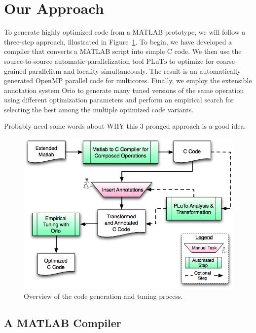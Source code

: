 \documentclass[11pt]{article}
\begin{document}




\section{Our Approach}
\label{sec:approach}

To generate highly optimized code from a MATLAB prototype, we will follow a three-step approach, illustrated in Figure~\ref{fig:process}.    To begin, we have developed a compiler that converts a MATLAB script into simple C code.   We then use the source-to-source automatic parallelization tool  PLuTo\cite{Pluto} to optimize for coarse-grained parallelism and locality simultaneously. The result is an automatically generated OpenMP parallel code for multicores.   Finally, we employ the extensible annotation system Orio to generate many tuned versions of the same operation using different optimization parameters and perform an empirical search for selecting the best among the multiple optimized code variants.

Probably need some words about WHY this 3 pronged approach is a good idea.

\begin{figure}[htbp]
\centering
\includegraphics[width=.7\textwidth]{figures/process.png}

\caption{Overview of the code generation and tuning process.}
\label{fig:process}
\end{figure}

\subsection{A MATLAB Compiler}
\label{sec:matlab}
\end{document}
